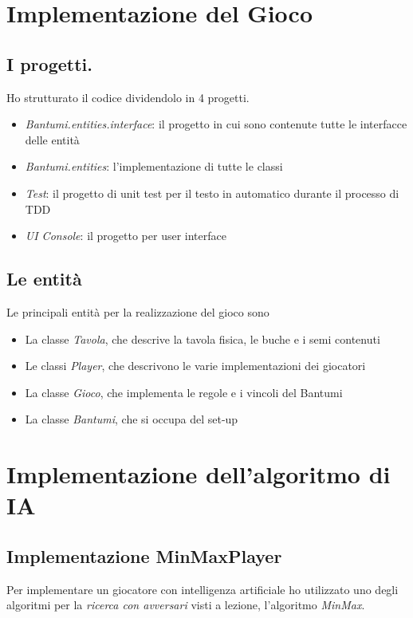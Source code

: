 \documentclass[paper=a4, fontsize=11pt]{scrartcl}	%
\numberwithin{equation}{section}															%
\numberwithin{figure}{section}																%
\numberwithin{table}{section}																%
\begin{document}
\section{Implementazione del Gioco}
\subsection{I progetti.}
Ho strutturato il codice dividendolo in 4 progetti.
\begin{itemize}
	\item \textit{Bantumi.entities.interface}: il progetto in cui sono contenute tutte le interfacce delle entit\`a
	\item \textit{Bantumi.entities}: l'implementazione di tutte le classi
	\item \textit{Test}: il progetto di unit test per il testo in automatico durante il processo di TDD
	\item \textit{UI Console}: il progetto per user interface
\end{itemize}

\subsection{Le entit\`a}
Le principali entit\`a per la realizzazione del gioco sono
\begin{itemize}
	\item La classe \textit{Tavola}, che descrive la tavola fisica, le buche e i semi contenuti
	\item Le classi \textit{Player}, che descrivono le varie implementazioni dei giocatori
	\item La classe \textit{Gioco}, che implementa le regole e i vincoli del Bantumi
	\item La classe \textit{Bantumi}, che si occupa del set-up
\end{itemize}


\section{Implementazione dell'algoritmo di IA}
\subsection{Implementazione MinMaxPlayer}
Per implementare un giocatore con intelligenza artificiale ho utilizzato uno degli algoritmi per la \textit{ ricerca con avversari} visti a lezione, l'algoritmo \textit{ MinMax}.
\end{document}
